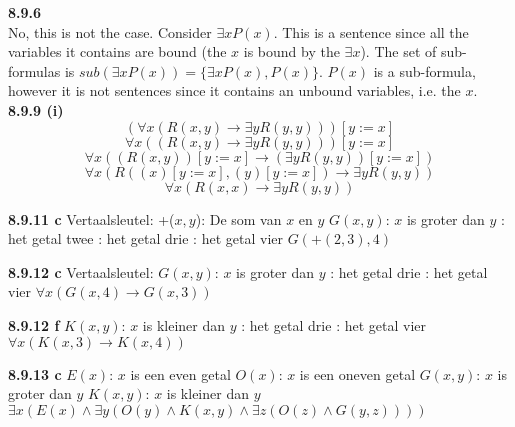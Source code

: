 \noindent \textbf{8.9.6} \\ No, this is not the case. Consider $\exists x P(x)$. This is a sentence since all the variables it contains are bound (the $x$ is bound by the $\exists x$). The set of sub-formulas is $sub(\exists x P(x)) = \{\exists x P(x), P(x)\}$. $P(x)$ is a sub-formula, however it is not sentences since it contains an unbound variables, i.e. the $x$.\\
\newline
\noindent \textbf{8.9.9 (i)} \\
$$(\forall x(R(x,y) \rightarrow \exists y R(y,y)))[y := x]$$
$$\forall x((R(x,y) \rightarrow \exists y R(y,y)))[y := x]$$ 
$$\forall x((R(x,y))[y := x] \rightarrow (\exists y R(y,y))[y := x])$$
$$\forall x(R((x)[y := x],(y)[y := x]) \rightarrow \exists y R(y,y))$$
$$\forall x(R(x,x) \rightarrow \exists y R(y,y))$$

\vspace{2mm}
\noindent \textbf{8.9.11 c}
\newline
Vertaalsleutel: \newline
+($x,y$): De som van $x$ en $y$\newline
$G(x,y)$: $x$ is groter dan $y$ : het getal twee : het getal drie : het getal vier \newline
$G(+(2,3),4)$ \newline

\vspace{2mm}
\noindent \textbf{8.9.12 c}
\newline
Vertaalsleutel: \newline
$G(x,y)$: $x$ is groter dan $y$ : het getal drie : het getal vier \newline
$\forall x (G(x,4) \rightarrow G(x,3))$ \newline

\vspace{2mm}
\noindent \textbf{8.9.12 f}
\newline
$K(x,y)$: $x$ is kleiner dan $y$ : het getal drie : het getal vier \newline
$\forall x (K(x,3)\rightarrow K(x,4))$

\vspace{2mm}
\noindent \textbf{8.9.13 c}
\newline
$E(x)$: $x$ is een even getal \newline
$O(x)$: $x$ is een oneven getal \newline
$G(x,y)$: $x$ is groter dan $y$ \newline
$K(x,y)$: $x$ is kleiner dan $y$ \newline
$\exists x (E(x) \land \exists y (O(y) \land K(x,y) \land \exists z (O(z) \land G(y,z))))$ \newline

